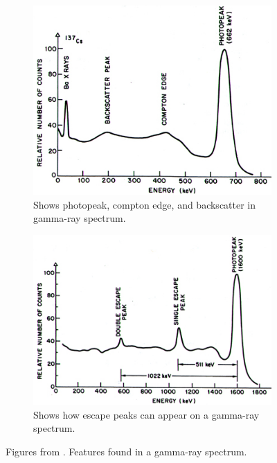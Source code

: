 \documentclass[a4paper,12pt]{article}
\begin{document}
\begin{figure}[H]
    \centering
    \begin{subfigure}{0.49\textwidth}
    \centering
    \includegraphics[width = \textwidth]{grs1.png}
    \caption{Shows photopeak, compton edge, and backscatter in gamma-ray spectrum.}
    \label{fig:grs1}
    \end{subfigure}
    \begin{subfigure}{0.49\textwidth}
    \centering
    \includegraphics[width = \textwidth]{grs2.png}
    \caption{Shows how escape peaks can appear on a gamma-ray spectrum.}
    \label{fig:grs2}
    \end{subfigure}
    \caption{Figures from \cite{CrosthwaitPulseAnalysis}. Features found in a gamma-ray spectrum.}
    \label{fig:combined}
\end{figure}
\end{document}
